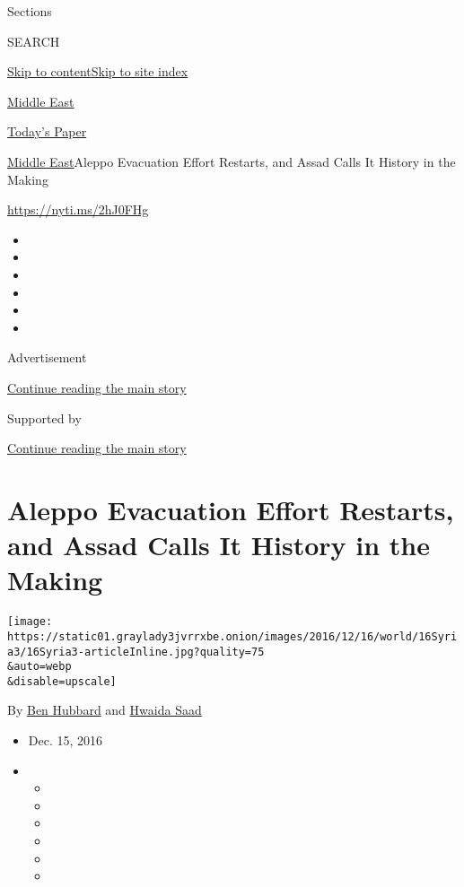 Sections

SEARCH

\protect\hyperlink{site-content}{Skip to
content}\protect\hyperlink{site-index}{Skip to site index}

\href{https://www.nytimes3xbfgragh.onion/section/world/middleeast}{Middle
East}

\href{https://myaccount.nytimes3xbfgragh.onion/auth/login?response_type=cookie\&client_id=vi}{}

\href{https://www.nytimes3xbfgragh.onion/section/todayspaper}{Today's
Paper}

\href{/section/world/middleeast}{Middle East}\textbar{}Aleppo Evacuation
Effort Restarts, and Assad Calls It History in the Making

\url{https://nyti.ms/2hJ0FHg}

\begin{itemize}
\item
\item
\item
\item
\item
\item
\end{itemize}

Advertisement

\protect\hyperlink{after-top}{Continue reading the main story}

Supported by

\protect\hyperlink{after-sponsor}{Continue reading the main story}

\hypertarget{aleppo-evacuation-effort-restarts-and-assad-calls-it-history-in-the-making}{%
\section{Aleppo Evacuation Effort Restarts, and Assad Calls It History
in the
Making}\label{aleppo-evacuation-effort-restarts-and-assad-calls-it-history-in-the-making}}

\texttt{[image: https://static01.graylady3jvrrxbe.onion/images/2016/12/16/world/16Syria3/16Syria3-articleInline.jpg?quality=75\\\&auto=webp\\\&disable=upscale]}

By \href{http://www.nytimes3xbfgragh.onion/by/ben-hubbard}{Ben Hubbard}
and \href{https://www.nytimes3xbfgragh.onion/by/hwaida-saad}{Hwaida
Saad}

\begin{itemize}
\item
  Dec. 15, 2016
\item
  \begin{itemize}
  \item
  \item
  \item
  \item
  \item
  \item
  \end{itemize}
\end{itemize}

